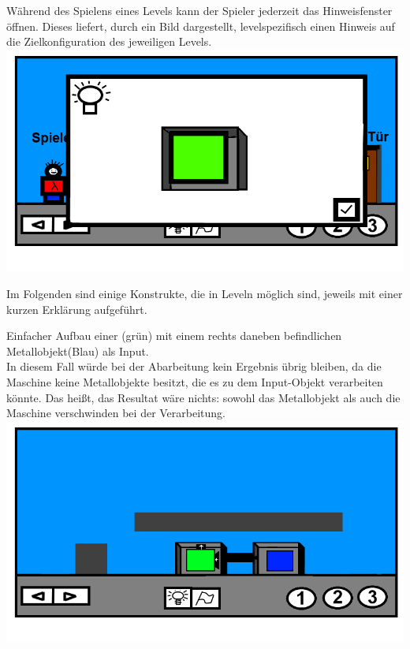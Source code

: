 \documentclass{scrartcl}
\begin{document}
\begin{description}
\begin{enumerate}
		\begin{minipage}{1\textwidth}
			\item \label{Levelaufbau:Levelhinweis} Während des Spielens eines Levels kann der Spieler jederzeit das Hinweisfenster öffnen. Dieses liefert, durch ein Bild dargestellt, levelspezifisch einen Hinweis auf die Zielkonfiguration des jeweiligen Levels.\\
			\includegraphics[scale=0.5]{assets/Levelhinweis}
		\end{minipage}
	\end{enumerate}
	
\clearpage

	\item[Konstrukte:] \label{Levelaufbau:Konstrukte} Im Folgenden sind einige Konstrukte, die in Leveln möglich sind, jeweils mit einer kurzen Erklärung aufgeführt.\\
	
		\begin{minipage}{1\textwidth}
			Einfacher Aufbau einer  (grün) mit einem rechts daneben befindlichen Metallobjekt(Blau) als Input.\\
			In diesem Fall würde bei der Abarbeitung kein Ergebnis übrig bleiben, da die Maschine keine Metallobjekte besitzt, die es zu dem Input-Objekt verarbeiten könnte. Das heißt, das Resultat wäre nichts: sowohl das Metallobjekt als auch die Maschine verschwinden bei der Verarbeitung.\\
			\includegraphics[scale=0.5]{assets/LevelBsp1}
		\end{minipage}
		

\end{description}
\end{document}
